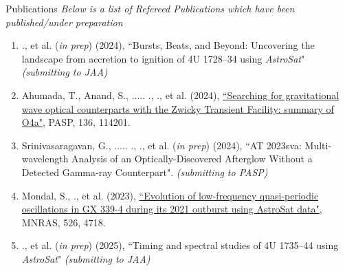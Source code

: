 \begin{rSection}{Publications} 
\hspace{-1em} {\textit{Below is a list of Refereed Publications which have been published/under preparation}}
\vspace{-0.5em}
\begin{enumerate}[itemsep=-0.5em, leftmargin=0.5em] %
    \item \me., et al. (\textit{in prep}) (2024), {``Bursts, Beats, and Beyond: Uncovering the landscape from accretion to ignition of 4U 1728--34 using \textit{AstroSat}"} \textit{(submitting to JAA)}
    \item Ahumada, T., Anand, S., ..... ., \me ., et al. (2024), {\href{https://iopscience.iop.org/article/10.1088/1538-3873/ad8265}{``Searching for gravitational wave optical counterparts with the Zwicky Transient Facility: summary of O4a"}}, PASP, 136, 114201.
    \item Srinivasaragavan, G., ..... ., \me., et al. (\textit{in prep}) (2024), {``AT 2023sva: Multi-wavelength Analysis of an Optically-Discovered Afterglow Without a Detected Gamma-ray Counterpart"}. \textit{(submitting to PASP)}
    \item Mondal, S., \me., et al. (2023), {\href{https://ui.adsabs.harvard.edu/link_gateway/2023MNRAS.526.4718M/doi:10.1093/mnras/stad3079}{``Evolution of low-frequency quasi-periodic oscillations in GX 339-4 during its 2021 outburst using AstroSat data"}}, MNRAS, 526, 4718. 
    \item \me., et al. (\textit{in prep}) (2025), {``Timing and spectral studies of 4U 1735--44 using \textit{AstroSat}"} \textit{(submitting to JAA)}
\end{enumerate}


\end{rSection}
